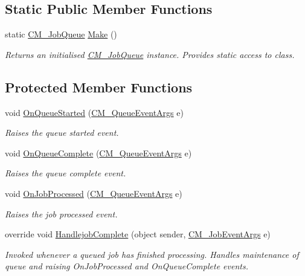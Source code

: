 \subsection*{Static Public Member Functions}
\begin{DoxyCompactItemize}
\item 
static \hyperlink{class_c_m___job_queue}{C\+M\+\_\+\+Job\+Queue} \hyperlink{class_c_m___job_queue_ab9832aba052e19ef3c726a05ca4849fa}{Make} ()
\begin{DoxyCompactList}\small\item\em Returns an initialised \hyperlink{class_c_m___job_queue}{C\+M\+\_\+\+Job\+Queue} instance. Provides static access to class. \end{DoxyCompactList}\end{DoxyCompactItemize}
\subsection*{Protected Member Functions}
\begin{DoxyCompactItemize}
\item 
void \hyperlink{class_c_m___job_queue_a3f9c1e210a1fb9d64459d50620548656}{On\+Queue\+Started} (\hyperlink{class_c_m___queue_event_args}{C\+M\+\_\+\+Queue\+Event\+Args} e)
\begin{DoxyCompactList}\small\item\em Raises the queue started event. \end{DoxyCompactList}\item 
void \hyperlink{class_c_m___job_queue_adc533901dffcd84b9e507e2dc848a414}{On\+Queue\+Complete} (\hyperlink{class_c_m___queue_event_args}{C\+M\+\_\+\+Queue\+Event\+Args} e)
\begin{DoxyCompactList}\small\item\em Raises the queue complete event. \end{DoxyCompactList}\item 
void \hyperlink{class_c_m___job_queue_a50f9608ca896727a3e993b2015a790a6}{On\+Job\+Processed} (\hyperlink{class_c_m___queue_event_args}{C\+M\+\_\+\+Queue\+Event\+Args} e)
\begin{DoxyCompactList}\small\item\em Raises the job processed event. \end{DoxyCompactList}\item 
override void \hyperlink{class_c_m___job_queue_afa8b77f601ce5094b44ad694d23e54f4}{Handlejob\+Complete} (object sender, \hyperlink{class_c_m___job_event_args}{C\+M\+\_\+\+Job\+Event\+Args} e)
\begin{DoxyCompactList}\small\item\em Invoked whenever a queued job has finished processing. Handles maintenance of queue and raising On\+Job\+Processed and On\+Queue\+Complete events. \end{DoxyCompactList}\end{DoxyCompactItemize}
